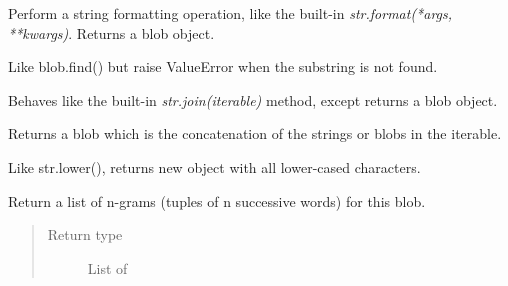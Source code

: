 \documentclass[letterpaper,10pt,english]{sphinxmanual}
\begin{document}
\begin{fulllineitems}
\begin{fulllineitems}
\label{api_reference:textblob_de.blob.Sentence.format}
Perform a string formatting operation, like the built-in
\emph{str.format(*args, **kwargs)}. Returns a blob object.

\end{fulllineitems}


\begin{fulllineitems}
\label{api_reference:textblob_de.blob.Sentence.index}
Like blob.find() but raise ValueError when the substring
is not found.

\end{fulllineitems}


\begin{fulllineitems}
\label{api_reference:textblob_de.blob.Sentence.join}
Behaves like the built-in \emph{str.join(iterable)} method, except
returns a blob object.

Returns a blob which is the concatenation of the strings or blobs
in the iterable.

\end{fulllineitems}


\begin{fulllineitems}
\label{api_reference:textblob_de.blob.Sentence.lower}
Like str.lower(), returns new object with all lower-cased characters.

\end{fulllineitems}


\begin{fulllineitems}
\label{api_reference:textblob_de.blob.Sentence.ngrams}
Return a list of n-grams (tuples of n successive words) for this
blob.
\begin{quote}\begin{description}
\item[{Return type}] \leavevmode
List of {\hyperref[api_reference:textblob_de.blob.WordList]{}}


\end{description}
\end{quote}
\end{fulllineitems}
\end{fulllineitems}
\end{document}
